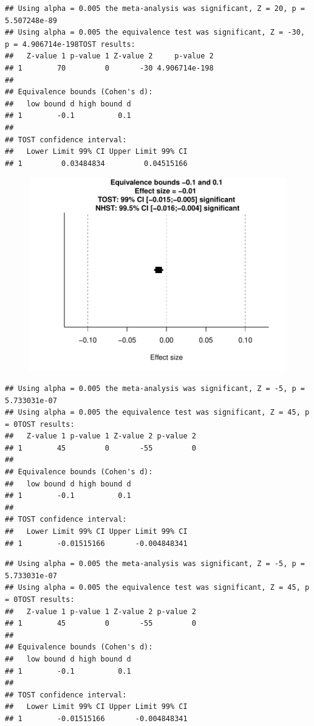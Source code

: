 \documentclass[english,man]{apa6}
\theoremstyle{definition}
\theoremstyle{definition}
\theoremstyle{definition}
\theoremstyle{remark}
\begin{document}
\begin{verbatim}
## Using alpha = 0.005 the meta-analysis was significant, Z = 20, p = 5.507248e-89
## Using alpha = 0.005 the equivalence test was significant, Z = -30, p = 4.906714e-198TOST results:
##   Z-value 1 p-value 1 Z-value 2     p-value 2
## 1        70         0       -30 4.906714e-198
## 
## Equivalence bounds (Cohen's d):
##   low bound d high bound d
## 1        -0.1          0.1
## 
## TOST confidence interval:
##   Lower Limit 99% CI Upper Limit 99% CI
## 1         0.03484834         0.04515166
\end{verbatim}

\begin{figure}[htbp]
\centering
\includegraphics{manuscript_files/figure-latex/unnamed-chunk-7-3.pdf}
\caption{}
\end{figure}

\begin{verbatim}
## Using alpha = 0.005 the meta-analysis was significant, Z = -5, p = 5.733031e-07
## Using alpha = 0.005 the equivalence test was significant, Z = 45, p = 0TOST results:
##   Z-value 1 p-value 1 Z-value 2 p-value 2
## 1        45         0       -55         0
## 
## Equivalence bounds (Cohen's d):
##   low bound d high bound d
## 1        -0.1          0.1
## 
## TOST confidence interval:
##   Lower Limit 99% CI Upper Limit 99% CI
## 1        -0.01515166       -0.004848341
\end{verbatim}

\begin{verbatim}
## Using alpha = 0.005 the meta-analysis was significant, Z = -5, p = 5.733031e-07
## Using alpha = 0.005 the equivalence test was significant, Z = 45, p = 0TOST results:
##   Z-value 1 p-value 1 Z-value 2 p-value 2
## 1        45         0       -55         0
## 
## Equivalence bounds (Cohen's d):
##   low bound d high bound d
## 1        -0.1          0.1
## 
## TOST confidence interval:
##   Lower Limit 99% CI Upper Limit 99% CI
## 1        -0.01515166       -0.004848341
\end{verbatim}
\end{document}
